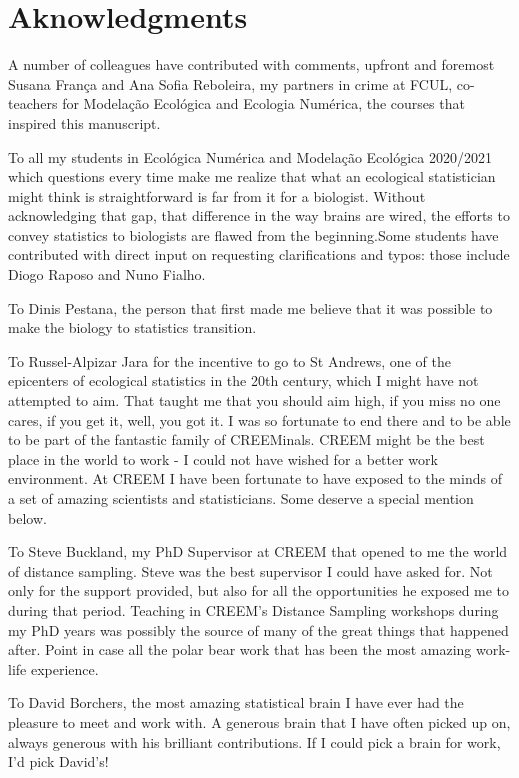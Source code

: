 \documentclass[
]{book}
\begin{document}
\chapter{Aknowledgments}\label{aknowledgments}

A number of colleagues have contributed with comments, upfront and foremost Susana França and Ana Sofia Reboleira, my partners in crime at FCUL, co-teachers for Modelação Ecológica and Ecologia Numérica, the courses that inspired this manuscript.

To all my students in Ecológica Numérica and Modelação Ecológica 2020/2021 which questions every time make me realize that what an ecological statistician might think is straightforward is far from it for a biologist. Without acknowledging that gap, that difference in the way brains are wired, the efforts to convey statistics to biologists are flawed from the beginning.Some students have contributed with direct input on requesting clarifications and typos: those include Diogo Raposo and Nuno Fialho.

To Dinis Pestana, the person that first made me believe that it was possible to make the biology to statistics transition.

To Russel-Alpizar Jara for the incentive to go to St Andrews, one of the epicenters of ecological statistics in the 20th century, which I might have not attempted to aim. That taught me that you should aim high, if you miss no one cares, if you get it, well, you got it. I was so fortunate to end there and to be able to be part of the fantastic family of CREEMinals. CREEM might be the best place in the world to work - I could not have wished for a better work environment. At CREEM I have been fortunate to have exposed to the minds of a set of amazing scientists and statisticians. Some deserve a special mention below.

To Steve Buckland, my PhD Supervisor at CREEM that opened to me the world of distance sampling. Steve was the best supervisor I could have asked for. Not only for the support provided, but also for all the opportunities he exposed me to during that period. Teaching in CREEM's Distance Sampling workshops during my PhD years was possibly the source of many of the great things that happened after. Point in case all the polar bear work that has been the most amazing work-life experience.

To David Borchers, the most amazing statistical brain I have ever had the pleasure to meet and work with. A generous brain that I have often picked up on, always generous with his brilliant contributions. If I could pick a brain for work, I'd pick David's!
\end{document}
